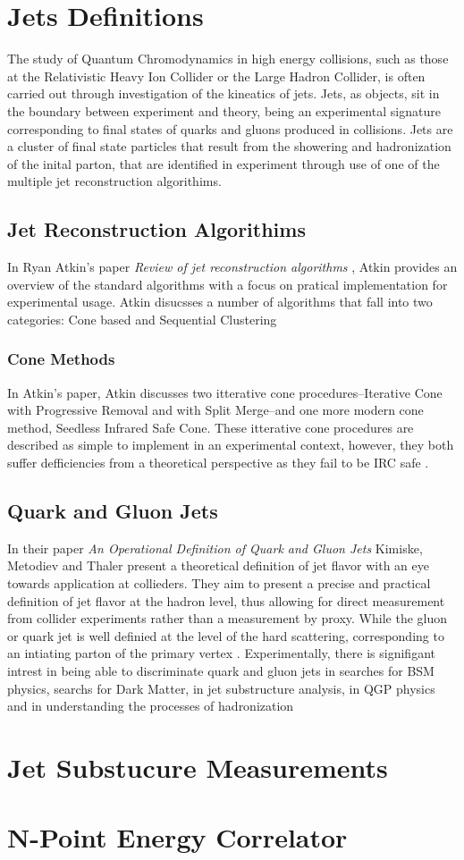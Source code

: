 %
\section{Jets Definitions}
The study of Quantum Chromodynamics in high energy collisions, such as those at the Relativistic Heavy Ion Collider or the Large Hadron Collider, is often carried out through investigation of the kineatics of jets.
Jets, as objects, sit in the boundary between experiment and theory, being an experimental signature corresponding to final states of quarks and gluons produced in collisions. 
Jets are a cluster of final state particles that result from the showering and hadronization of the inital parton, that are identified in experiment through use of one of the multiple jet reconstruction algorithims. 
\subsection{Jet Reconstruction Algorithims}
In Ryan Atkin's paper \textit{Review of jet reconstruction algorithms} \cite{Atkin2015}, Atkin provides an overview of the standard algorithms with a focus on pratical implementation for experimental usage. %
Atkin disucsses a number of algorithms that fall into two categories: Cone based and Sequential Clustering 
\subsubsection{Cone Methods}
	In Atkin's paper, Atkin discusses two itterative cone procedures--Iterative Cone with Progressive Removal and with Split Merge--and one more modern cone method, Seedless Infrared Safe Cone. 
	These itterative cone procedures are described as simple to implement in an experimental context, however, they both suffer defficiencies from a theoretical perspective as they fail to be IRC safe \cite{Atkin2015} \cite{Salam2007}.
\subsection{Quark and Gluon Jets}	
	In their paper \textit{An Operational Definition of Quark and Gluon Jets} Kimiske, Metodiev and Thaler present a theoretical definition of jet flavor with an eye towards application at collieders. 
	They aim to present a precise and practical definition of jet flavor at the hadron level, thus allowing for direct measurement from collider experiments rather than a measurement by proxy. 
	While the gluon or quark jet is well definied at the level of the hard scattering, corresponding to an intiating parton of the primary vertex \cite{Jones1989} \cite{Fodor1990}. 
	Experimentally, there is signifigant intrest in being able to discriminate quark and gluon jets in searches for BSM physics, searchs for Dark Matter, in jet substructure analysis, in QGP physics and in understanding the processes of hadronization \cite{Gallicchio2011}\cite{Lima2017}\cite{Bhattecherjee2017}\cite{}

\section{Jet Substucure Measurements}
\section{N-Point Energy Correlator}
%
